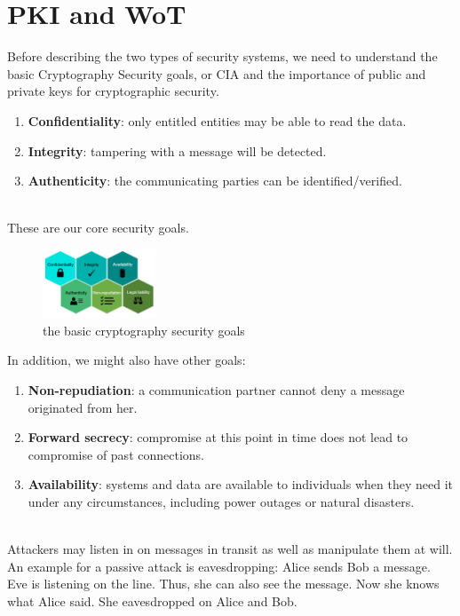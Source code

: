 \section{PKI and WoT}

Before describing the two types of security systems, we need to understand the basic 
Cryptography Security goals, or CIA and the importance of public and private keys 
for cryptographic security\cite{b31}.
\begin{enumerate}[]
    \item \textbf{Conﬁdentiality}: only entitled entities may be able to read the data.
    \item \textbf{Integrity}: tampering with a message will be detected.
    \item \textbf{Authenticity}: the communicating parties can be identiﬁed/veriﬁed.
    \end{enumerate}
\\
These are our core security goals.
\begin{figure}[H] %
    \centering %
    \includegraphics[width=0.3\textwidth]{figures/cia.png} %
    \caption{the basic cryptography security goals} %
    \label{Fig.2: the basic Cryptography Security goals} %
\end{figure}
In addition, we might also have other goals:
\begin{enumerate}[]
    \item \textbf{Non-repudiation}: a communication partner cannot deny a message originated from her.
    \item \textbf{Forward secrecy}: compromise at this point in time does not lead to compromise of past connections.
    \item \textbf{Availability}: systems and data are available to individuals when they need it under any circumstances, including power outages or natural disasters.
    \end{enumerate}
\\
Attackers may listen in on messages in transit as well as manipulate them at will. An example
for a passive attack is eavesdropping: Alice sends Bob a message. Eve is listening on the line.
Thus, she can also see the message. Now she knows what Alice said. She eavesdropped on
Alice and Bob.


